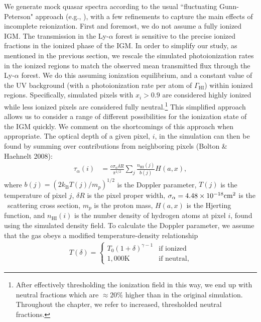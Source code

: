  
We generate mock quasar spectra according to the usual ``fluctuating Gunn-Peterson" approach (e.g., \citealt{Croft:2000hs}), with a few refinements to capture the main effects of incomplete reionization. First and foremost, we do not assume a fully ionized IGM. The transmission in the Ly-$\alpha$ forest is sensitive to the precise ionized fractions in the ionized phase of the IGM. In order to simplify our study, as mentioned in the previous section, we rescale the simulated photoionization rates in the ionized regions to match the observed mean transmitted flux through the Ly-$\alpha$ forest. We do this assuming
ionization equilibrium, and a constant value of the UV background (with a photoionization rate per atom of $\Gamma_{\text{HI}}$) within ionized regions. Specifically, simulated pixels with $x_i > 0.9$ are considered highly ionized while less ionized pixels are considered fully neutral.\footnote{After effectively thresholding the ionization field in this way, we end up with neutral fractions which are $\approx 20\%$ higher than in the original simulation. Throughout the chapter, we refer to increased, thresholded neutral fractions.} This simplified approach allows us to consider a range of different possibilities for
the ionization state of the IGM quickly. We comment on the shortcomings of this approach when appropriate.
The optical depth of a given pixel, $i$, in the simulation can then be found by summing over contributions from neighboring pixels (Bolton \& Haehnelt 2008):
\begin{align}
\tau_{\alpha}(i) &= \frac{c \sigma_{\alpha}\delta R}{\pi^{1/2}}\sum_j \frac{n_{\text{HI}}(j)}{b(j)}H(a,x),
\end{align}
where $b(j) = (2 k_{\text{B}}T(j)/m_{p})^{1/2}$ is the Doppler parameter, $T(j)$ is the temperature of pixel $j$, $\delta R$ is the pixel proper width, $\sigma_\alpha = 4.48 \times 10^{-18}\text{cm}^{2}$ is the \lya\ scattering cross section, $m_p$ is the proton mass, $H(a,x)$ is the Hjerting function, and $n_{\text{HI}}(i)$ is the number density of hydrogen atoms at pixel $i$, found using the simulated density field. To calculate the Doppler parameter, we assume that the gas obeys a modified temperature-density relationship
\begin{align}
T(\delta) = \begin{cases} T_0(1 + \delta)^{\gamma - 1} &\mbox{if ionized}\\
1,000 \text{K} &\mbox{if neutral}, \end{cases} \label{eq:TDrelation}
\end{align}
